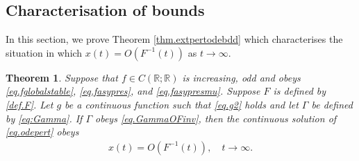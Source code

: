 \documentclass[a4paper,10pt,reqno]{amsart}
\numberwithin{equation}{section}
\newtheorem{theorem}{Theorem}
\theoremstyle{definition}
\theoremstyle{remark}
\DeclareMathOperator{\1}{\mathbbm 1}
\begin{document}
	\subsection{Characterisation of bounds}
	In this section, we prove Theorem \ref{thm.extpertodebdd} which characterises the situation in which $x(t)=O(F^{-1}(t))$ as $t\to\infty$. 
	
	\begin{theorem}
		Suppose that $f\in C(\mathbb{R};\mathbb{R})$ is increasing, odd and obeys \eqref{eq.fglobalstable}, \eqref{eq.fasypres}, and \eqref{eq.fasypresmu}. Suppose $F$ is defined by \eqref{def.F}.  Let $g$ be a continuous function such that \eqref{eq.g2} holds and let $\Gamma$ be defined by \eqref{eq:Gamma}. 
		If $\Gamma$ obeys \eqref{eq.GammaOFinv}, then the continuous solution of \eqref{eq.odepert}  obeys 
		\begin{align*}
			x(t)=O(F^{-1}(t)), \quad t\to\infty. 
		\end{align*}
	\end{theorem}
	
\end{document}

